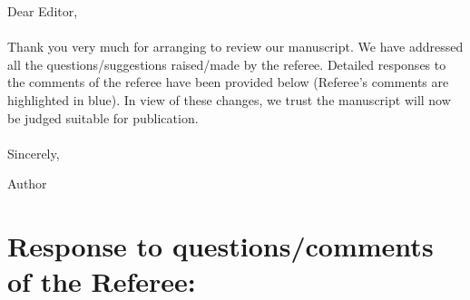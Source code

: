 \documentclass[aps,prb,onecolumn,nofootinbib,citeautoscript,10pt]{revtex4-2}
\begin{document}
	
	
	
\noindent Dear Editor,\\
\\ \noindent Thank you very much for arranging to review our manuscript. We have addressed all the questions/suggestions raised/made by the referee. Detailed responses to the comments of the referee have been provided below (Referee's comments are highlighted in blue). In view of these changes, we trust the manuscript will now be judged suitable for publication. 
\\\\ \noindent Sincerely,
	
\noindent Author

\vspace{0.5 cm }	





\section{Response to questions/comments of the Referee:}
\end{document}
